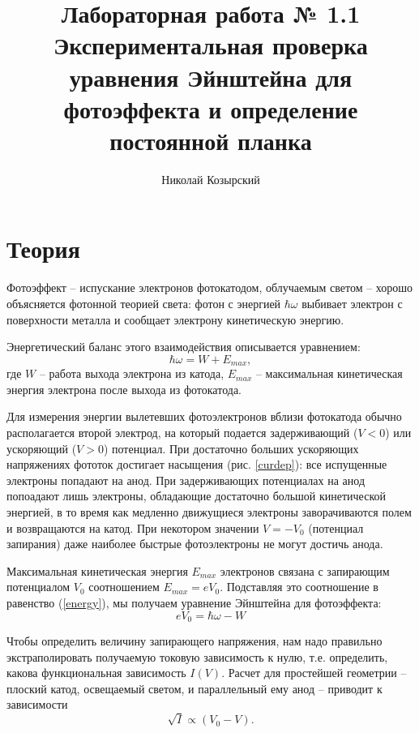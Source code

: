 \documentclass[12pt,a4paper]{article}
\author{Николай Козырский}
\title{Лабораторная работа № 1.1 \\
		 Экспериментальная проверка уравнения Эйнштейна для фотоэффекта и определение постоянной планка}
\begin{document}
\maketitle
\section{Теория}
Фотоэффект -- испускание электронов фотокатодом, облучаемым светом -- хорошо объясняется фотонной теорией света: фотон с энергией $ \hbar \omega $ выбивает электрон с поверхности металла и сообщает электрону кинетическую энергию.

Энергетический баланс этого взаимодействия описывается уравнением:
\begin{equation} \label{energy}
\hbar \omega = W + E_{max},
\end{equation}
где $W$ -- работа выхода электрона из катода, $E_{max}$ -- максимальная кинетическая энергия электрона после выхода из фотокатода.



Для измерения энергии вылетевших фотоэлектронов вблизи фотокатода обычно располагается второй электрод, на который подается задерживающий ($V < 0$) или ускоряющий ($V > 0$) потенциал. При достаточно больших ускоряющих напряжениях фототок достигает насыщения (рис. \ref{curdep}): все испущенные электроны попадают на анод. При задерживающих потенциалах на анод попоадают лишь электроны, обладающие достаточно большой кинетической энергией, в то время как медленно движущиеся электроны заворачиваются полем и возвращаются на катод. При некотором значении $V = -V_0$ (потенциал запирания) даже наиболее быстрые фотоэлектроны не могут достичь анода. 

Максимальная кинетическая энергия $E_{max}$ электронов связана с запирающим потенциалом $V_0$ соотношением $E_{max} = e V_0$. Подставляя это соотношение в равенство (\ref{energy}), мы получаем уравнение Эйнштейна для фотоэффекта:
\begin{equation} \label{einstein}
e V_0 = \hbar \omega - W
\end{equation}

Чтобы определить величину запирающего напряжения, нам надо правильно экстраполировать получаемую токовую зависимость к нулю, т.е. определить, какова функциональная зависимость $I(V)$. Расчет для простейшей геометрии -- плоский катод, освещаемый светом, и параллельный ему анод -- приводит к зависимости 
\begin{equation} \label{Idep}
\sqrt{I} \propto (V_0 - V).
\end{equation}
\end{document}

